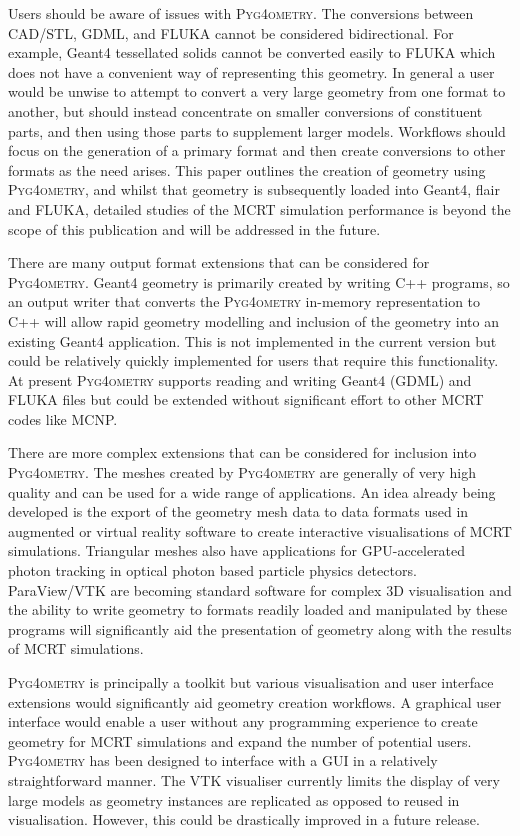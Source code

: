 \documentclass[final,5p,times,twocolumn]{elsarticle}
\newcommand{\PYGEOMETRY}{\textsc{Pyg4ometry}}
\begin{document}
Users should be aware of issues with \PYGEOMETRY{}. The conversions between CAD/STL, GDML, and FLUKA
cannot be considered bidirectional. For example, Geant4 tessellated solids cannot be converted easily to FLUKA which does not
have a convenient way of representing this geometry. In general a user would be unwise to attempt to convert a very large
geometry from one format to another, but should instead concentrate on smaller conversions of constituent parts, 
and then using those parts to supplement larger models. Workflows should focus
on the generation of a primary format and then create conversions to other formats as the need arises. This paper outlines
the creation of geometry using \PYGEOMETRY{}, and whilst that geometry is subsequently loaded into Geant4, flair and FLUKA, detailed
studies of the MCRT simulation performance is beyond the scope of this publication and will be addressed in the future.

There are many output format extensions that can be considered for \PYGEOMETRY{}.
Geant4 geometry is primarily created by writing C++ programs, so an output writer that
converts the \PYGEOMETRY{} in-memory representation to C++ will allow rapid geometry
modelling and inclusion of the geometry into an existing Geant4 application. This is not
implemented in the current version but could be relatively quickly implemented for users that
require this functionality. At present \PYGEOMETRY{} supports reading and writing
Geant4 (GDML) and FLUKA files but could be extended without significant effort to other MCRT codes
like MCNP.

There are more complex extensions that can be considered for inclusion into \PYGEOMETRY{}.
The meshes created by \PYGEOMETRY{} are generally of very high quality and can be used for a
wide range of applications. An idea already being developed is the export of the geometry mesh data to
data formats used in augmented or virtual reality software to create interactive visualisations of MCRT
simulations.  Triangular meshes also have applications for GPU-accelerated photon tracking in
optical photon based particle physics detectors. ParaView/VTK are becoming standard software for 
complex 3D visualisation and the ability to write geometry to formats readily loaded and manipulated 
by these programs will significantly aid the presentation of geometry along with the results of MCRT 
simulations.

\PYGEOMETRY{} is principally a toolkit but various visualisation and user interface extensions would
significantly aid geometry creation workflows. A graphical user interface would enable a user without any
 programming experience to create geometry for MCRT simulations and expand the number of potential users.
\PYGEOMETRY{} has been designed to interface with a GUI in a relatively straightforward manner. The VTK visualiser currently
limits the display of very large models as geometry instances are replicated as opposed to reused in visualisation.  However,
this could be drastically improved in a future release.
\end{document}
